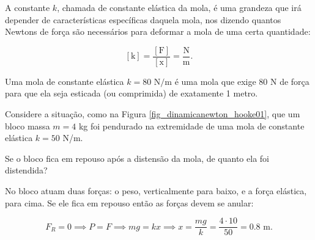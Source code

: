 
A constante $k$, chamada de constante elástica da mola, é uma grandeza que irá depender de características específicas daquela mola, nos dizendo quantos Newtons de força são necessários para deformar a mola de uma certa quantidade:

$$ [\text{k}] = \dfrac{[\text{F}]}{ [\text{x}]}  = \dfrac{\text{N}}{\text{m}}. $$

Uma mola de constante elástica $k = 80 \text{ N}/ $m é uma mola que exige 80 N de força para que ela seja esticada (ou comprimida) de exatamente 1 metro.


\vspace{0.3cm}

\begin{exemplo}[Nível I]\label{exemplo_newton_hooke01}

Considere a situação, como na Figura \ref{fig_dinamicanewton_hooke01}, que um bloco massa $m=4$ kg foi pendurado na extremidade de uma mola de constante elástica $k=50$ N/m.

Se o bloco fica em repouso após a distensão da mola, de quanto ela foi distendida?

\resolucao

No bloco atuam duas forças: o peso, verticalmente para baixo, e a força elástica, para cima. Se ele fica em repouso então as forças devem se anular:

$$ F_R = 0 \implies P = F \implies mg = kx \implies x = \dfrac{mg}{k}=\dfrac{4 \cdot 10}{50}= 0.8 \text{ m.}$$




\end{exemplo}



\vspace{0.3cm}

